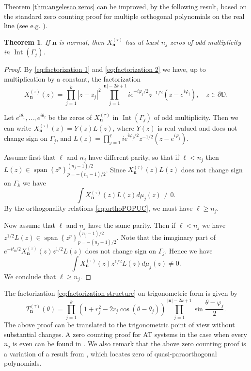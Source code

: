 \documentclass[reqno,centertags,11pt,draft]{amsart}
\newtheorem{thm}{Theorem}[section]
\newcommand{\D}{\mathbb{D}}
\renewcommand{\d}{\partial}
\newcommand{\abs}[1]{\left|#1\right|}
\newcommand{\set}[1]{\left\{#1\right\}}
\begin{document}
Theorem \ref{thm:angelesco zeros} can be improved, by the following result, based on the standard zero counting proof for multiple orthogonal polynomials on the real line (see e.g. \cite{Ismail}). 

\begin{thm}\label{thm:zero counting}
    If $\bm{n}$ is normal, then $X_{\bm{n}}^{(\tau)}$ has at least $n_j$ zeros of odd multiplicity in $\operatorname{Int}(\Gamma_j)$. 
\end{thm}
\begin{proof}
By \eqref{eq:factorization 1} and \eqref{eq:factorization 2} we have, up to multiplication by a constant, the factorization
\begin{equation}\label{eq:factorization structure}
    X_{\bm{n}}^{(\tau)}(z) = \prod_{j = 1}^k\abs{z-z_j}^2 \prod_{j = 1}^{\abs{\bm{n}}-2k+1} ie^{-i\varphi_j/2}z^{-1/2}(z-e^{i\varphi_j}), \quad z \in \d\D.
\end{equation}

Let $e^{i\theta_1},\dots,e^{i\theta_\ell}$ be the zeros of $X_{\bm{n}}^{(\tau)}$ in $\operatorname{Int}(\Gamma_j)$ of odd multiplicity. Then we can write $X_{\bm{n}}^{(\tau)}(z) = Y(z)L(z)$, where $Y(z)$ is real valued and does not change sign on $\Gamma_j$, and $L(z) = \prod_{j = 1}^{\ell}ie^{i\varphi_j/2}z^{-1/2}(z-e^{i\varphi_j})$. 

Assume first that $\ell$ and $n_j$ have different parity, so that if $\ell < n_j$ then $L(z) \in \operatorname{span}\set{z^p}_{p = -(n_j-1)/2}^{(n_j-1)/2}$. Since $X_{\bm{n}}^{(\tau)}(z)L(z)$ does not change sign on $\Gamma_k$ we have
\begin{equation}
    \int X_{\bm{n}}^{(\tau)}(z)L(z)d\mu_j(z) \neq 0.
\end{equation}
By the orthogonality relations \eqref{eq:orthoPOPUC}, we must have $\ell \geq n_j$. 

Now assume that $\ell$ and $n_j$ have the same parity. Then if $\ell < n_j$ we have $z^{1/2}L(z) \in \operatorname{span}\set{z^p}_{p = -(n_j-1)/2}^{(n_j-1)/2}$. Note that the imaginary part of $e^{-it_0/2}X_{\bm{n}}^{(\tau)}(z)z^{1/2}L(z)$ does not change sign on $\Gamma_j$. Hence we have
\begin{equation}
    \int X_{\bm{n}}^{(\tau)}(z)z^{1/2}L(z)d\mu_j(z) \neq 0.
\end{equation}
We conclude that $\ell \geq n_j$.
\end{proof}

The factorization \eqref{eq:factorization structure} on trigonometric form is given by
\begin{equation}
    T_{\bm{n}}^{(\tau)}(\theta) = \prod_{j=1}^k(1+r_j^2-2r_j\cos(\theta-\theta_j))\prod_{j=1}^{\abs{\bm{n}}-2k+1}\sin{\frac{\theta-\varphi_j}{2}}. 
\end{equation}
The above proof can be translated to the trigonometric point of view without substantial changes. A zero counting proof for AT systems in the case when every $n_j$ is even can be found in \cite{Mil}. We also remark that the above zero counting proof is a variation of a result from \cite{quasi popuc}, which locates zero of quasi-paraorthogonal polynomials. 
\end{document}
